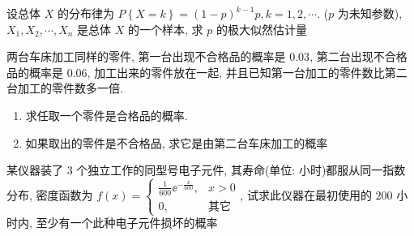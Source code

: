 \begin{ti}[12 分]
	设总体 $X$ 的分布律为 $P\left\{X=k\right\}=(1-p)^{k-1}p, k=1,2,\cdots.$ ($p$ 为未知参数), $X_1,X_2,\cdots,X_n$ 是总体 $X$ 的一个样本, 求 $p$ 的极大似然估计量
\end{ti}

\begin{ti}[10 分]
	两台车床加工同样的零件, 第一台出现不合格品的概率是 $0.03$, 第二台出现不合格品的概率是 $0.06$, 加工出来的零件放在一起, 并且已知第一台加工的零件数比第二台加工的零件数多一倍.
	\begin{enumerate}
		\item 求任取一个零件是合格品的概率.
		\item 如果取出的零件是不合格品, 求它是由第二台车床加工的概率
	\end{enumerate}
\end{ti}

\begin{ti}[10 分]
	某仪器装了 $3$ 个独立工作的同型号电子元件, 其寿命(单位: 小时)都服从同一指数分布, 密度函数为 $f(x)=
	\begin{cases}
	\frac{1}{600}\ee^{-\frac{x}{600}}, & x>0\\
	0, & \text{其它}
	\end{cases}
	$, 试求此仪器在最初使用的 $200$ 小时内, 至少有一个此种电子元件损坏的概率
\end{ti}